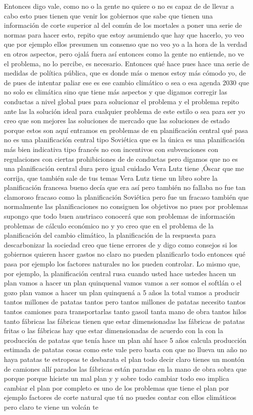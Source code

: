 Entonces digo vale, como no o la gente no quiere o no es capaz de de llevar a cabo esto pues tienen que venir los gobiernos que sabe que tienen una información de corte superior al del común de los mortales a poner una serie de normas para hacer esto, repito que estoy asumiendo que hay que hacerlo, yo veo que por ejemplo ellos presumen un consenso que no veo yo a la hora de la verdad en otros aspectos, pero ojalá fuera así entonces como la gente no entiende, no ve el problema, no lo percibe, es necesario. Entonces qué hace pues hace una serie de medidas de política pública, que es donde más o menos estoy más cómodo yo, de de pues de intentar paliar ese es ese cambio climático o sea o esa agenda 2030 que no solo es climática sino que tiene más aspectos y que digamos corregir las conductas a nivel global pues para solucionar el problema y el problema repito ante las la solución ideal para cualquier problema de este estilo o sea para ser yo creo que son mejores las soluciones de mercado que las soluciones de estado porque estos son aquí entramos en problemas de en planificación central qué pasa no es una planificación central tipo Soviética que es la única es una planificación más bien indicativa tipo francés no con incentivos con subvenciones con regulaciones con ciertas prohibiciones de de conductas pero digamos que no es una planificación central dura pero igual cuidado Vera Lutz tiene ,Óscar que me corrija, que también sale de tus temas  Vera Lutz tiene un libro sobre la planificación francesa bueno decía que era así pero también no fallaba no fue tan clamoroso fracaso como la planificación Soviética pero fue un fracaso también que normalmente las planificaciones no consiguen los objetivos no pues por problemas supongo que todo buen austriaco conocerá que son problemas de información problemas de cálculo económico no y yo creo que en el problema de la planificación del cambio climático, la planificación de la respuesta para descarbonizar la sociedad creo que tiene errores de y digo como consejos si los gobiernos quieren hacer gastos no claro no pueden planificarlo todo entonces qué pasa por ejemplo los factores naturales no los pueden controlar. Lo mismo que, por ejemplo, la planificación central rusa cuando usted hace ustedes hacen un plan vamos a hacer un plan quinquenal vamos vamos a ser somos el softlán o el gozo plan vamos a hacer un plan quinquená a 5 años la total vamos a producir tantos millones de patatas tantos pero tantos millones de patatas necesito tantos tantos camiones para transportarlas tanto gasoil tanta mano de obra tantos hilos tanto fábricas las fábricas tienen que estar dimensionadas las fábricas de patatas fritas o las fábricas hay que estar dimensionadas de acuerdo con la con la producción de patatas que tenía hace un plan ahí hace 5 años calcula producción estimada de patatas cosas como este vale pero basta con que no llueva un año no haya patatas te estropeas te desbarata el plan todo decir claro tienes un montón de camiones allí parados las fábricas están paradas en la mano de obra sobra que porque porque hiciste un mal plan y y sobre todo cambiar todo eso implica cambiar el plan por completo es uno de los problemas que tiene el plan por ejemplo factores de corte natural que tú no puedes contar con ellos climáticos pero claro te viene un volcán te 
